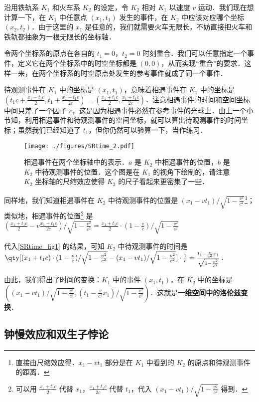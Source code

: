 沿用铁轨系 $K_1$ 和火车系 $K_2$ 的设定，令 $K_2$ 相对 $K_1$ 以速度 $v$ 运动．我们现在想计算一下，在 $K_1$ 中任意点 $(x_1,t_1)$ 发生的事件，在 $K_2$ 中应该对应哪个坐标 $(x_2,t_2)$．由于这里的 $x_1$ 是任意的，我们就需要火车无限长，不妨直接把火车和铁轨都抽象为一根无限长的坐标轴．

令两个坐标系的原点在各自的 $t_1=0$，$t_2=0$ 时刻重合．我们可以任意指定一个事件，定义它在两个坐标系中的时空坐标都是 $(0,0)$，从而实现“重合”的要求．这样一来，在两个坐标系的时空原点处发生的参考事件就成了同一个事件．

待观测事件在 $K_1$ 中的坐标是 $(x_1, t_1)$，意味着相遇事件在 $K_1$ 中的坐标是 $(t_1c+\frac{x_1-t_1c}{2}, t_1+\frac{x_1-t_1c}{2c})=(\frac{x_1+t_1c}{2},\frac{x_1+t_1c}{2c})$．注意相遇事件的时间和空间坐标中间只差了一个因子 $c$，这是因为相遇事件必然在参考事件的光球上．由上一个小节知，利用相遇事件和待观测事件的空间坐标，就可以算出待观测事件的时间坐标；虽然我们已经知道了 $t_1$，但你仍然可以验算一下，当作练习．

\begin{figure}[ht]
\centering
\texttt{[image: ./figures/SRtime\_2.pdf]}
\caption{相遇事件在两个坐标轴中的表示．$a$ 是 $K_2$ 中相遇事件的位置，$b$ 是 $K_2$ 中待观测事件的位置．这个图是在 $K_1$ 的视角下绘制的，请注意 $K_2$ 坐标轴的尺缩效应使得 $K_2$ 的尺子看起来更密集了一些．} \label{SRtime_fig2}
\end{figure}

同样地，我们知道相遇事件在 $K_2$ 中待观测事件的位置是 $(x_1-vt_1)/\sqrt{1-\frac{v^2}{c^2}}$\footnote{直接由尺缩效应得．$x_1-vt_1$ 部分是在 $K_1$ 中看到的 $K_2$ 的原点和待观测事件的距离．}；类似地，相遇事件的位置\footnote{可以用 $\frac{x_1+t_1c}{2}$ 代替 $x_1$，$\frac{x_1+t_1c}{2c}$ 代替 $t_1$，代入 $(x_1-vt_1)/\sqrt{1-\frac{v^2}{c^2}}$ 得到．}  是 $(\frac{x_1+t_1c}{2}-v\frac{x_1+t_1c}{2c})/\sqrt{1-\frac{v^2}{c^2}}=\frac{x_1+t_1c}{2}\cdot(1-\frac{v}{c})/\sqrt{1-\frac{v^2}{c^2}}$

代入\autoref{SRtime_fig1} 的结果，可知 $K_2$ 中待观测事件的时间是 $\qty[(x_1+t_1c)\cdot(1-\frac{v}{c})/\sqrt{1-\frac{v^2}{c^2}}-(x_1-vt_1)/\sqrt{1-\frac{v^2}{c^2}}]\cdot \frac{1}{c}=\frac{t_1-\frac{v}{c^2}x_1}{\sqrt{1-\frac{v^2}{c^2}}}$．

由此，我们得出了时间的变换：$K_1$ 中的事件 $(x_1, t_1)$，在 $K_2$ 中的坐标是 $((x_1-vt_1)/\sqrt{1-\frac{v^2}{c^2}}, (t_1-\frac{v}{c^2}x_1)/\sqrt{1-\frac{v^2}{c^2}})$．这就是\textbf{一维空间中的洛伦兹变换}．

\subsection{钟慢效应和双生子悖论}

